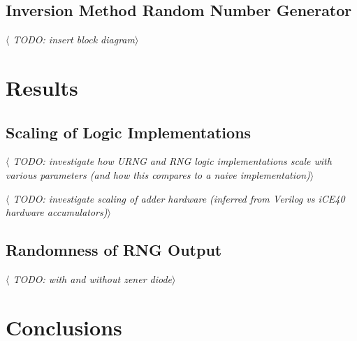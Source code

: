 \documentclass[12pt]{article}
\begin{document}
  \subsection{Inversion Method Random Number Generator}
    \textit{$\langle$ TODO: insert block diagram$\rangle$}



%
%

\section{Results}

  \subsection{Scaling of Logic Implementations}
    \textit{$\langle$ TODO: investigate how URNG and RNG logic implementations scale with various parameters (and how this compares to a naive implementation)$\rangle$}

    \textit{$\langle$ TODO: investigate scaling of adder hardware (inferred from Verilog vs iCE40 hardware accumulators)$\rangle$}

  \subsection{Randomness of RNG Output}
    \textit{$\langle$ TODO: with and without zener diode$\rangle$}


\newpage



%
%

\section{Conclusions}

\newpage



\noindent

\markboth{}{}
\printbibliography
\markboth{}{}

\newpage
\end{document}
